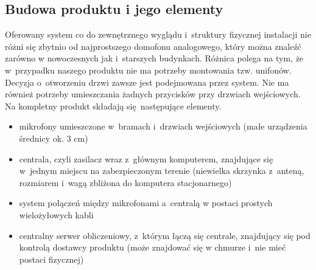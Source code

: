 \documentclass[../main.tex]{subfiles}
\begin{document}
{    \subsection{Budowa produktu i jego elementy}
    \label{chapter1:opis_produktu:budowa_produktu} {
        Oferowany system co do zewnętrznego wyglądu i~struktury fizycznej instalacji
        nie różni się zbytnio od najprostszego domofonu analogowego, który można
        znaleźć zarówno w nowoczesnych jak i~starszych budynkach. Różnica polega na
        tym, że w~przypadku naszego produktu nie ma potrzeby montowania tzw. unifonów.
        Decyzja o~otworzeniu drzwi zawsze jest podejmowana przez system. Nie ma również
        potrzeby umieszczania żadnych przycisków przy drzwiach wejściowych. Na kompletny 
        produkt składają się następujące elementy.
        \begin{itemize}
            \item mikrofony umieszczone w~bramach i~drzwiach wejściowych (małe
            urządzenia średnicy ok. 3 cm)
            \item centrala, czyli zasilacz wraz z~głównym komputerem, znajdujące się
            w~jednym miejscu na zabezpieczonym terenie (niewielka skrzynka z~anteną,
            rozmiarem i~wagą zbliżona do komputera stacjonarnego)
            \item system połączeń między mikrofonami a~centralą w postaci prostych
            wielożyłowych kabli
            \item centralny serwer obliczeniowy, z~którym łączą się centrale,
            znajdujący się pod kontrolą dostawcy produktu (może znajdować się w chmurze
            i~nie mieć postaci fizycznej)
        \end{itemize}
    }

}
\end{document}
